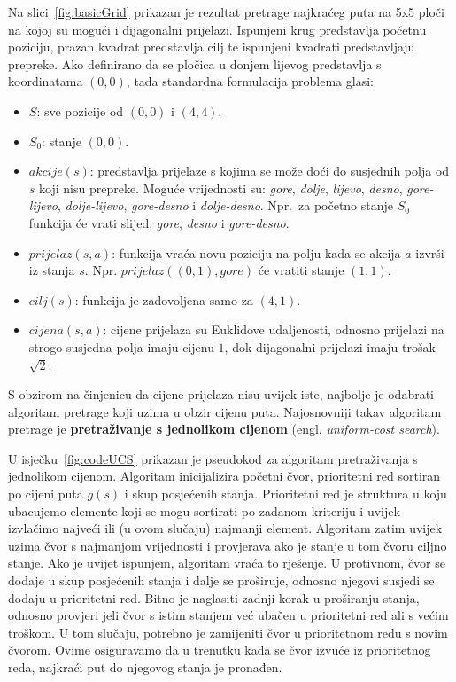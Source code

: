 \documentclass[times, utf8, zavrsni, numeric]{fer}
\begin{document}
Na slici~\ref{fig:basicGrid} prikazan je rezultat pretrage najkraćeg puta na 5x5 ploči na kojoj su mogući i dijagonalni prijelazi.
Ispunjeni krug predstavlja početnu poziciju, prazan kvadrat predstavlja cilj te ispunjeni kvadrati predstavljaju prepreke.
Ako definirano da se pločica u donjem lijevog predstavlja s koordinatama \((0, 0)\), tada standardna formulacija problema glasi:
\begin{itemize}
    \item \(S\): sve pozicije od \((0, 0)\) i \((4, 4)\).
    \item \(S_0\): stanje \((0, 0)\).
    \item \(akcije(s)\): predstavlja prijelaze s kojima se može doći do susjednih polja od \(s\) koji nisu prepreke. 
    Moguće vrijednosti su: \textit{gore}, \textit{dolje}, \textit{lijevo}, \textit{desno}, \textit{gore-lijevo}, \textit{dolje-lijevo}, \textit{gore-desno} i \textit{dolje-desno}. 
    Npr.\ za početno stanje \(S_0\) funkcija će vrati slijed: \textit{gore}, \textit{desno} i \textit{gore-desno}. 
    \item \(prijelaz(s, a)\): funkcija vraća novu poziciju na polju kada se akcija \(a\) izvrši iz stanja \(s\). Npr. \(prijelaz((0, 1), gore)\) će vratiti stanje \((1, 1)\).
    \item \(cilj(s)\): funkcija je zadovoljena samo za \((4, 1)\).
    \item \(cijena(s, a)\): cijene prijelaza su Euklidove udaljenosti, odnosno prijelazi na strogo susjedna polja imaju cijenu \(1\), dok dijagonalni prijelazi imaju trošak \(\sqrt{2}\).
\end{itemize}

\par S obzirom na činjenicu da cijene prijelaza nisu uvijek iste, najbolje je odabrati algoritam pretrage koji uzima u obzir cijenu puta.
Najosnovniji takav algoritam pretrage je \textbf{pretraživanje s jednolikom cijenom} (engl. \textit{uniform-cost search}).

\par U isječku~\ref{fig:codeUCS} prikazan je pseudokod za algoritam pretraživanja s jednolikom cijenom. 
Algoritam inicijalizira početni čvor, prioritetni red sortiran po cijeni puta \(g(s)\) i skup posjećenih stanja. 
Prioritetni red je struktura u koju ubacujemo elemente koji se mogu sortirati po zadanom kriteriju i uvijek izvlačimo najveći ili (u ovom slučaju) najmanji element.
Algoritam zatim uvijek uzima čvor s najmanjom vrijednosti i provjerava ako je stanje u tom čvoru ciljno stanje.
Ako je uvijet ispunjem, algoritam vraća to rješenje.
U protivnom, čvor se dodaje u skup posjećenih stanja i dalje se proširuje, odnosno njegovi susjedi se dodaju u prioritetni red.
Bitno je naglasiti zadnji korak u proširanju stanja, odnosno provjeri jeli čvor s istim stanjem već ubačen u prioritetni red ali s većim troškom.
U tom slučaju, potrebno je zamijeniti čvor u prioritetnom redu s novim čvorom.
Ovime osiguravamo da u trenutku kada se čvor izvuće iz prioritetnog reda, najkraći put do njegovog stanja je pronađen.
\end{document}
